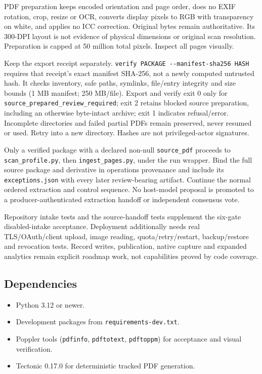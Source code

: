 \documentclass[
]{article}
\providecommand{\tightlist}{%
  \setlength{\itemsep}{0pt}\setlength{\parskip}{0pt}}
\begin{document}
PDF preparation keeps encoded orientation and page order, does no EXIF
rotation, crop, resize or OCR, converts display pixels to RGB with
transparency on white, and applies no ICC correction. Original bytes
remain authoritative. Its 300-DPI layout is not evidence of physical
dimensions or original scan resolution. Preparation is capped at 50
million total pixels. Inspect all pages visually.

Keep the export receipt separately.
\texttt{verify\ PACKAGE\ -\/-manifest-sha256\ HASH} requires that
receipt's exact manifest SHA-256, not a newly computed untrusted hash.
It checks inventory, safe paths, symlinks, file/entry integrity and size
bounds (1 MB manifest; 250 MB/file). Export and verify exit 0 only for
\texttt{source\_\allowbreak{}prepared\_\allowbreak{}review\_\allowbreak{}required};
exit 2 retains blocked source preparation, including an otherwise
byte-intact archive; exit 1 indicates refusal/error. Incomplete
directories and failed partial PDFs remain preserved, never resumed or
used. Retry into a new directory. Hashes are not privileged-actor
signatures.

Only a verified package with a declared non-null
\texttt{source\_\allowbreak{}pdf} proceeds to
\texttt{scan\_\allowbreak{}profile.py}, then
\texttt{ingest\_\allowbreak{}pages.py}, under the run wrapper. Bind the
full source package and derivative in operations provenance and include
its \texttt{exceptions.json} with every later review-bearing artifact.
Continue the normal ordered extraction and control sequence. No
host-model proposal is promoted to a producer-authenticated extraction
handoff or independent consensus vote.

Repository intake tests and the source-handoff tests supplement the
six-gate disabled-intake acceptance. Deployment additionally needs real
TLS/OAuth/client upload, image reading, quota/retry/restart,
backup/restore and revocation tests. Record writes, publication, native
capture and expanded analytics remain explicit roadmap work, not
capabilities proved by code coverage.

\subsection{Dependencies}\label{dependencies}

\begin{itemize}
\tightlist
\item
  Python 3.12 or newer.
\item
  Development packages from \texttt{requirements-dev.txt}.
\item
  Poppler tools (\texttt{pdfinfo}, \texttt{pdftotext},
  \texttt{pdftoppm}) for acceptance and visual verification.
\item
  Tectonic 0.17.0 for deterministic tracked PDF generation.
\end{itemize}
\end{document}
